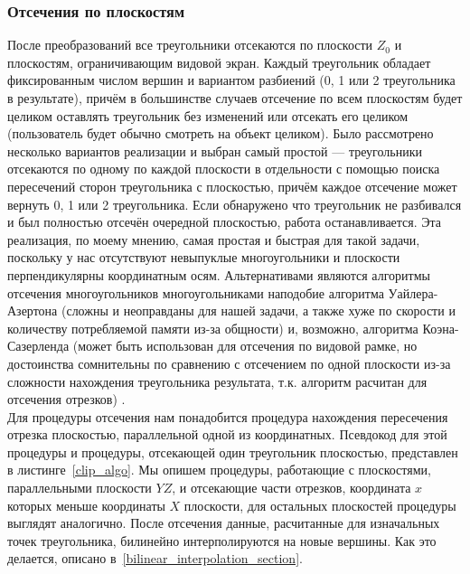 \documentclass[a4paper,12pt]{report}
\numberwithin{equation}{section}
\begin{document}
\subsubsection{Отсечения по плоскостям}
После преобразований все треугольники отсекаются по плоскости $Z_0$ и плоскостям, ограничивающим видовой экран. Каждый треугольник обладает фиксированным числом вершин и вариантом разбиений (0, 1 или 2 треугольника в результате), причём в большинстве случаев отсечение по всем плоскостям будет целиком оставлять треугольник без изменений или отсекать его целиком (пользователь будет обычно смотреть на объект целиком). Было рассмотрено несколько вариантов реализации и выбран самый простой --- треугольники отсекаются по одному по каждой плоскости в отдельности с помощью поиска пересечений сторон треугольника с плоскостью, причём каждое отсечение может вернуть 0, 1 или 2 треугольника. Если обнаружено что треугольник не разбивался и был полностью отсечён очередной плоскостью, работа останавливается. Эта реализация, по моему мнению, самая простая и быстрая для такой задачи, поскольку у нас отсутствуют невыпуклые многоугольники и плоскости перпендикулярны координатным осям. Альтернативами являются алгоритмы отсечения многоугольников многоугольниками наподобие алгоритма Уайлера-Азертона (сложны и неоправданы для нашей задачи, а также хуже по скорости и количеству потребляемой памяти из-за общности) и, возможно, алгоритма Коэна-Сазерленда (может быть использован для отсечения по видовой рамке, но достоинства сомнительны по сравнению с отсечением по одной плоскости из-за сложности нахождения треугольника результата, т.к. алгоритм расчитан для отсечения отрезков) \cite{rogerscgelements}. \\
Для процедуры отсечения нам понадобится процедура нахождения пересечения отрезка плоскостью, параллельной одной из координатных. Псевдокод для этой процедуры и процедуры, отсекающей один треугольник плоскостью, представлен в листинге~\ref{clip_algo}. Мы опишем процедуры, работающие с плоскостями, параллельными плоскости $YZ$, и отсекающие части отрезков, координата $x$ которых меньше координаты $X$ плоскости, для остальных плоскостей процедуры выглядят аналогично. После отсечения данные, расчитанные для изначальных точек треугольника, билинейно интерполируются на новые вершины. Как это делается, описано в~\ref{bilinear_interpolation_section}.
\end{document}

